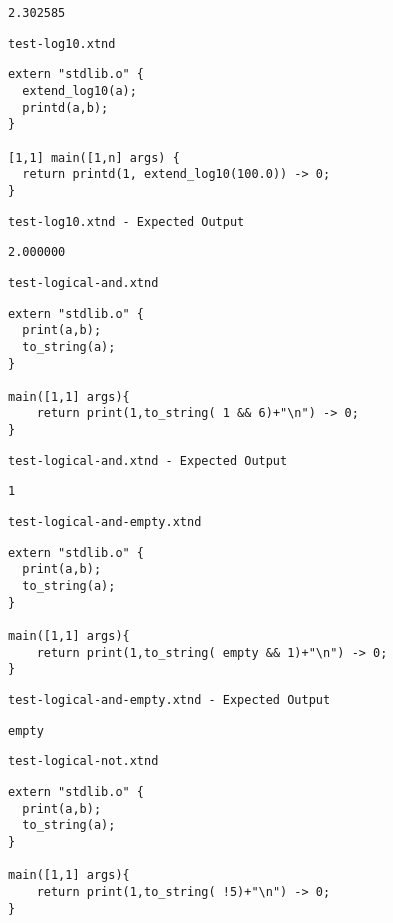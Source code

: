 \begin{lstlisting}
2.302585
\end{lstlisting}


\medskip \noindent \texttt{test-log10.xtnd}


\begin{lstlisting}
extern "stdlib.o" {
  extend_log10(a);
  printd(a,b);
}

[1,1] main([1,n] args) {
  return printd(1, extend_log10(100.0)) -> 0;
}
\end{lstlisting}


\medskip \noindent \texttt{test-log10.xtnd - Expected Output}


\begin{lstlisting}
2.000000
\end{lstlisting}


\medskip \noindent \texttt{test-logical-and.xtnd}


\begin{lstlisting}
extern "stdlib.o" {
  print(a,b);
  to_string(a);
}

main([1,1] args){
	return print(1,to_string( 1 && 6)+"\n") -> 0;
}
\end{lstlisting}


\medskip \noindent \texttt{test-logical-and.xtnd - Expected Output}


\begin{lstlisting}
1
\end{lstlisting}


\medskip \noindent \texttt{test-logical-and-empty.xtnd}


\begin{lstlisting}
extern "stdlib.o" {
  print(a,b);
  to_string(a);
}

main([1,1] args){
	return print(1,to_string( empty && 1)+"\n") -> 0;
}
\end{lstlisting}


\medskip \noindent \texttt{test-logical-and-empty.xtnd - Expected Output}


\begin{lstlisting}
empty
\end{lstlisting}


\medskip \noindent \texttt{test-logical-not.xtnd}


\begin{lstlisting}
extern "stdlib.o" {
  print(a,b);
  to_string(a);
}

main([1,1] args){
	return print(1,to_string( !5)+"\n") -> 0;
}
\end{lstlisting}


